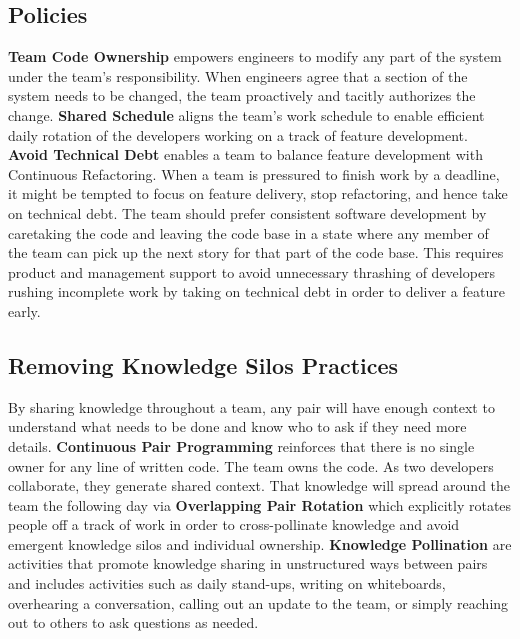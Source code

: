 \subsection{Policies}
\textbf{Team Code Ownership} empowers engineers to modify any part of the system under the team’s responsibility. When engineers agree that a section of the system needs to be changed, the team proactively and tacitly authorizes the change. \textbf{Shared Schedule} aligns the team’s work schedule to enable efficient daily rotation of the developers working on a track of feature development. \textbf{Avoid Technical Debt} enables a team to balance feature development with Continuous Refactoring. When a team is pressured to finish work by a deadline, it might be tempted to focus on feature delivery, stop refactoring, and hence take on technical debt. The team should prefer consistent software development by caretaking the code and leaving the code base in a state where any member of the team can pick up the next story for that part of the code base. This requires product and management support to avoid unnecessary thrashing of developers rushing incomplete work by taking on technical debt in order to deliver a feature early.

\subsection{Removing Knowledge Silos Practices}
By sharing knowledge throughout a team, any pair will have enough context to understand what needs to be done and know who to ask if they need more details. \textbf{Continuous Pair Programming} reinforces that there is no single owner for any line of written code. The team owns the code. As two developers collaborate, they generate shared context. That knowledge will spread around the team the following day via \textbf{Overlapping Pair Rotation} which explicitly rotates people off a track of work in order to cross-pollinate knowledge and avoid emergent knowledge silos and individual ownership. \textbf{Knowledge Pollination} are activities that promote knowledge sharing in unstructured ways between pairs and includes activities such as daily stand-ups, writing on whiteboards, overhearing a conversation, calling out an update to the team, or simply reaching out to others to ask questions as needed. 

